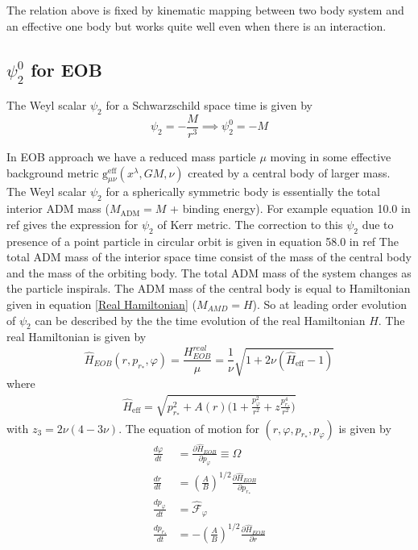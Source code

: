 \documentclass[prd,preprintnumbers,onecolumn,eqsecnum,floatfix,letter]{revtex4}
\begin{document}
The relation above is fixed by kinematic mapping between two body system and an effective one body but works quite well even when there is an interaction. 
\subsection{$\psi_{2}^{0}$ for EOB} 
The Weyl scalar $\psi_{2}$ for a Schwarzschild space time is given by 
\begin{equation}
	\psi_{2} = -\frac{M}{r^3} \implies \psi_{2}^{0} = -M
\end{equation} 

In EOB approach we have a reduced mass particle $\mu$ moving in some effective background metric $\text{g}^{\text{eff}}_{\mu\nu}\left(x^{\lambda}, GM, \nu\right)$ created by a central body of larger mass. The Weyl scalar $\psi_{2}$ for a spherically symmetric body is essentially the total interior ADM mass ($M_{\text{ADM}} = M$ + binding energy). For example equation 10.0 in ref\cite{Newman:2014} gives the expression for $\psi_{2}$ of Kerr metric. The correction to this $\psi_{2}$ due to presence of a point particle in circular orbit is given in equation 58.0 in ref\cite{Merlin2016PRD}  The total ADM mass of the interior space time consist of the mass of the central body and the mass of the orbiting body. The total ADM mass of the system changes as the particle inspirals. The ADM mass of the central body is equal to Hamiltonian given in equation \ref{Real Hamiltonian} ($M_{AMD} = H$). So at leading order evolution of $\psi_{2}$ can be described by the the time evolution of the real Hamiltonian $H$. The real Hamiltonian is given by
    \begin{equation}
    	\hat{H}_{EOB}(r, p_{r_*}, \varphi) = \frac{H^{real}_{EOB}}{\mu} = \frac{1}{\nu}\sqrt{1 + 2\nu\left(\hat{H}_{\text{eff}}-1\right)}\nonumber
    \end{equation}
where
\begin{align}
\hat{H}_{\text{eff}} = \sqrt{p^2_{r_*} + A\left(r\right)\Bigg(1 + \frac{p_{\varphi}^2}{r^2} + z\frac{p_{r_*}^4}{r^2}\Bigg)}
\end{align}
with $z_3 = 2\nu(4-3\nu)$. The equation of motion for $\left(r, \varphi, p_{r_*}, p_{\varphi}\right)$ is given by
\begin{align}
	\frac{d\varphi}{dt} &= \frac{\partial\hat{H}_{EOB}}{\partial p_{\varphi}} \equiv \Omega\\
	\frac{dr}{dt} &=\left(\frac{A}{B}\right)^{1/2}\frac{\partial\hat{H}_{EOB}}{\partial p_{r_*}}\\
	\frac{dp_{\varphi}}{dt} &=\hat{\mathscr{F}}_{\varphi}\\
	\frac{dp_{r_*}}{dt} &=-\left(\frac{A}{B}\right)^{1/2}\frac{\partial\hat{H}_{EOB}}{\partial r}
\end{align}
\end{document}
